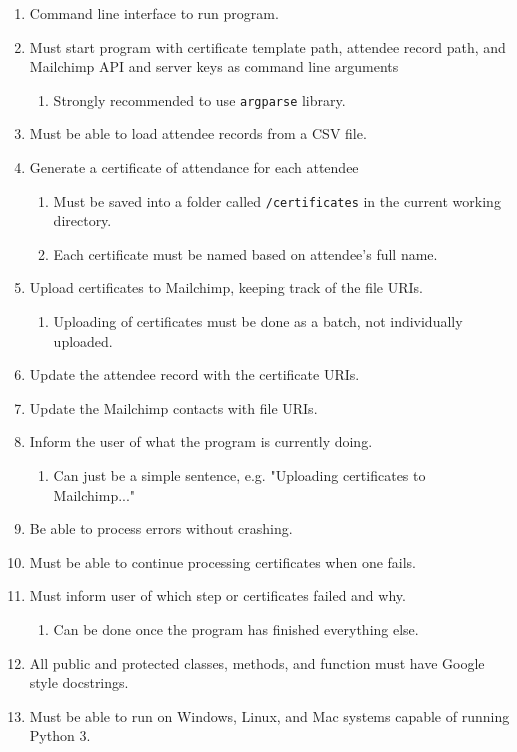 \documentclass[11pt]{article}
\begin{document}
\begin{enumerate}
    \item Command line interface to run program.
    \item Must start program with certificate template path, attendee record path, and Mailchimp API and server keys as command line arguments
    \begin{enumerate}
        \item Strongly recommended to use \texttt{argparse} library.
    \end{enumerate}
    \item Must be able to load attendee records from a CSV file.
    \item Generate a certificate of attendance for each attendee
    \begin{enumerate}
        \item Must be saved into a folder called \texttt{/certificates} in the current working directory.
        \item Each certificate must be named based on attendee's full name.
    \end{enumerate}
    \item Upload certificates to Mailchimp, keeping track of the file URIs.
    \begin{enumerate}
        \item Uploading of certificates must be done as a batch, not individually uploaded.
    \end{enumerate}
    \item Update the attendee record with the certificate URIs.
    \item Update the Mailchimp contacts with file URIs.
    \item Inform the user of what the program is currently doing.
    \begin{enumerate}
        \item Can just be a simple sentence, e.g. "Uploading certificates to Mailchimp..."
    \end{enumerate}
    \item Be able to process errors without crashing.
    \item Must be able to continue processing certificates when one fails.
    \item Must inform user of which step or certificates failed and why.
    \begin{enumerate}
        \item Can be done once the program has finished everything else.
    \end{enumerate}
    \item All public and protected classes, methods, and function must have Google style docstrings.
    \item Must be able to run on Windows, Linux, and Mac systems capable of running Python 3.
\end{enumerate}
\end{document}
